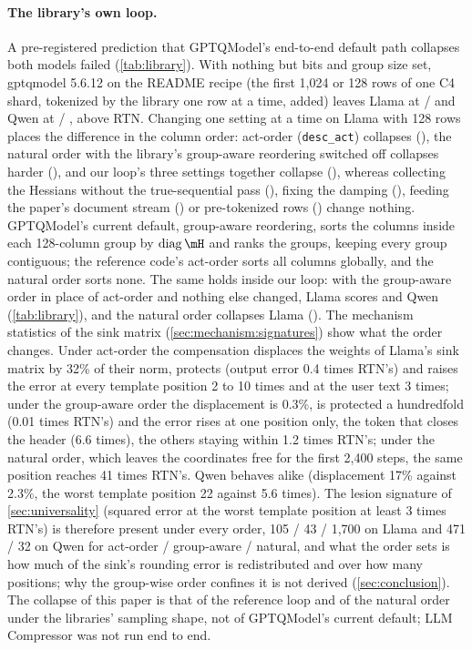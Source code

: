 \paragraph{The library's own loop.}
A pre-registered prediction that GPTQModel's end-to-end default path collapses both models failed (\cref{tab:library}).
With nothing but bits and group size set, gptqmodel 5.6.12 on the README recipe (the first 1,024 or 128 rows of one C4 shard, tokenized by the library one row at a time, \bos{} added) leaves Llama at \LibLoneKIF{} / \LibLIF{} and Qwen at \LibQoneKIF{} / \LibQIF{}, above RTN.
Changing one setting at a time on Llama with 128 rows places the difference in the column order: act-order (\texttt{desc\_act}) collapses (\LibLdescIF{}), the natural order with the library's group-aware reordering switched off collapses harder (\LibLnogarIF{}), and our loop's three settings together collapse (\LibLourcfgIF{}), whereas collecting the Hessians without the true-sequential pass (\LibLnotseqIF{}), fixing the damping (\LibLfixdampIF{}), feeding the paper's document stream (\LibLpapercalIF{}) or pre-tokenized rows (\LibLpretokIF{}) change nothing.
GPTQModel's current default, group-aware reordering, sorts the columns inside each 128-column group by $\operatorname{diag}\hess$ and ranks the groups, keeping every group contiguous; the reference code's act-order sorts all columns globally, and the natural order sorts none.
The same holds inside our loop: with the group-aware order in place of act-order and nothing else changed, Llama scores \GarLIF{} and Qwen \GarQIF{} (\cref{tab:library}), and the natural order collapses Llama (\NoaoLIF{}).
The mechanism statistics of the sink matrix (\cref{sec:mechanism:signatures}) show what the order changes. Under act-order the compensation displaces the weights of Llama's sink matrix by 32\% of their norm, protects \bos{} (output error 0.4 times RTN's) and raises the error at every template position 2 to 10 times and at the user text 3 times; under the group-aware order the displacement is 0.3\%, \bos{} is protected a hundredfold (0.01 times RTN's) and the error rises at one position only, the token that closes the header (6.6 times), the others staying within 1.2 times RTN's; under the natural order, which leaves the \bos{} coordinates free for the first 2,400 steps, the same position reaches 41 times RTN's. Qwen behaves alike (displacement 17\% against 2.3\%, the worst template position 22 against 5.6 times).
The lesion signature of \cref{sec:universality} (squared error at the worst template position at least 3 times RTN's) is therefore present under every order, 105 / 43 / 1,700 on Llama and 471 / 32 on Qwen for act-order / group-aware / natural, and what the order sets is how much of the sink's rounding error is redistributed and over how many positions; why the group-wise order confines it is not derived (\cref{sec:conclusion}).
The collapse of this paper is that of the reference loop and of the natural order under the libraries' sampling shape, not of GPTQModel's current default; LLM Compressor was not run end to end.

